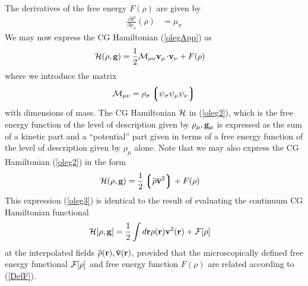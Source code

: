 \documentclass[b5paper,openright,10pt]{book}
\newcommand{\esc}{\!\cdot\!}
\newcommand{\llg}{\left\lgroup}
\newcommand{\rlg}{\right\rgroup}
\begin{document}
\begin{appendices}
The derivatives of the free energy $F(\rho)$  are given by 
\begin{align}
   \frac{\partial F}{\partial\rho_\sigma}(\rho) &=\mu_\sigma
\label{Fd2Ap}
\end{align}
We may now express the CG Hamiltonian (\ref{olegApp}) as
\begin{align}
  {\cal H}(\rho,{\bf g}) &=  \frac{1}{2}{\cal M}_{\mu\nu}{\bf v}_\mu\esc{\bf v}_\nu
+ F(\rho)
\label{oleg2}
\end{align}
where we introduce the matrix
\begin{align}
  {\cal M}_{\mu\nu}={\rho}_\sigma\llg\psi_\sigma\psi_\mu\psi_\nu\rlg
\label{AvecalM}
\end{align}
with dimensions  of mass.  The  CG Hamiltonian ${\cal  H}$ in
(\ref{oleg2}),  which is  the free  energy  function of  the level  of
description given by $\rho_\mu,{\bf g}_\mu$ is expressed as the sum of
a  kinetic part  and a  ``potential'' part  given in  terms of  a free
energy function of the level of description given by $\rho_\mu$ alone.
Note   that  we   may   also  express   the  CG Hamiltonian (\ref{oleg2})
in the form
\begin{align}      {\cal       H}(\rho,{\bf      g})       &=
  \frac{1}{2}\llg\overline{\rho}\overline{\bf v}^2\rlg + F(\rho)
\label{oleg3}
\end{align}
This expression
(\ref{oleg3}) is identical  to the result of  evaluating the continuum
CG Hamiltonian functional
\begin{align}
  {\cal H}[\rho,{\bf g}]&=\frac{1}{2}\int d{\bf r}\rho({\bf r}){\bf v}^2({\bf r})+{\cal F}[\rho]
\end{align}
at  the  interpolated fields  $\overline{\rho}({\bf  r}),\overline{\bf
  v}({\bf r})$, provided that  the microscopically defined free energy
functional  ${\cal F}[\rho]$  and free  energy function  $F(\rho)$ are
related according to (\ref{DefF}).


\end{appendices}
\end{document}
